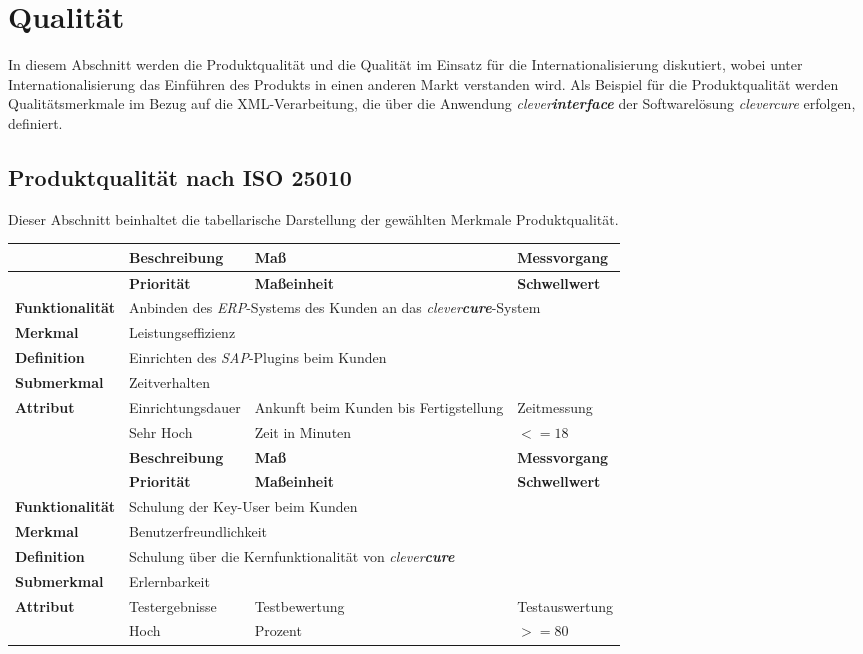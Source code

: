\section{Qualität}
\label{sec:quality}
In diesem Abschnitt werden die Produktqualität und die Qualität im Einsatz für die Internationalisierung diskutiert, wobei unter Internationalisierung das Einführen des Produkts in einen anderen Markt verstanden wird.
\newline
\newline
Als Beispiel für die Produktqualität werden Qualitätsmerkmale im Bezug auf die XML-Verarbeitung, die über die Anwendung \emph{clever\textbf{interface}} der Softwarelösung \emph{clevercure} erfolgen, definiert.
\subsection{Produktqualität nach ISO 25010}
\label{sec:qualtity-product-quality}
Dieser Abschnitt beinhaltet die tabellarische Darstellung der gewählten Merkmale Produktqualität.
\newline
\bgroup
\def\arraystretch{1.5}%
\begin{tabularx}{\textwidth}{ p{70pt} | X | X | X }
	\hline
	& \textbf{Beschreibung} & \textbf{Maß} & \textbf{Messvorgang} \\ \hline
	& \textbf{Priorität} & \textbf{Maßeinheit} & \textbf{Schwellwert} \\ \hline
	\textbf{Funktionalität} & \multicolumn{3}{p{300pt}}{Anbinden des \emph{ERP}-Systems des Kunden an das \emph{clever\textbf{cure}}-System} \\ \hline
	\textbf{Merkmal} & \multicolumn{3}{X}{Leistungseffizienz} \\ \hline
	\textbf{Definition} & \multicolumn{3}{p{380pt}}{Einrichten des \emph{SAP}-Plugins beim Kunden} \\ \hline
	\textbf{Submerkmal} & \multicolumn{3}{X}{Zeitverhalten} \\ \hline 
	\textbf{Attribut} & Einrichtungsdauer & Ankunft beim Kunden bis Fertigstellung & Zeitmessung  \\ \hline
	               & Sehr Hoch               & Zeit in Minuten & $<= 18$  \\ 
    \hline 
    \hline 
	& \textbf{Beschreibung} & \textbf{Maß} & \textbf{Messvorgang} \\ \hline
	& \textbf{Priorität} & \textbf{Maßeinheit} & \textbf{Schwellwert} \\ \hline
	\textbf{Funktionalität} & \multicolumn{3}{p{300pt}}{Schulung der Key-User beim Kunden} \\ \hline
	\textbf{Merkmal} & \multicolumn{3}{X}{Benutzerfreundlichkeit} \\ \hline
	\textbf{Definition} & \multicolumn{3}{p{380pt}}{Schulung über die Kernfunktionalität von \emph{clever\textbf{cure}}} \\ \hline
	\textbf{Submerkmal} & \multicolumn{3}{X}{Erlernbarkeit} \\ \hline 
	\textbf{Attribut} & Testergebnisse & Testbewertung  & Testauswertung  \\ \hline
	& Hoch               & Prozent & $>= 80$  \\ \hline
\end{tabularx}
